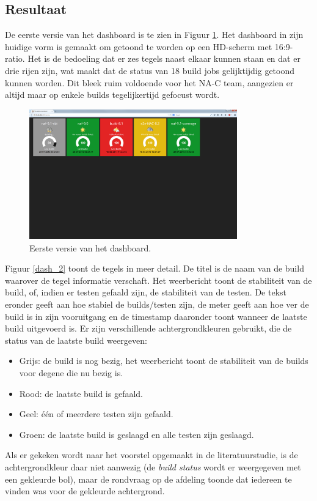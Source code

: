 \documentclass[10pt,a4paper]{article}
\begin{document}
\subsection{Resultaat}
\label{resultaat}
De eerste versie van het dashboard is te zien in Figuur \ref{dash_1}. Het dashboard in zijn huidige vorm is gemaakt om getoond te worden op een HD-scherm met 16:9-ratio. Het is de bedoeling dat er zes tegels naast elkaar kunnen staan en dat er drie rijen zijn, wat maakt dat de status van 18 build jobs gelijktijdig getoond kunnen worden. Dit bleek ruim voldoende voor het NA-C team, aangezien er altijd maar op enkele builds tegelijkertijd gefocust wordt.

\begin{figure}[ht!]
\centering
\includegraphics[width=90mm]{dashboard_screenshot1.png}
\caption{Eerste versie van het dashboard.} 
\label{dash_1}
\end{figure}

Figuur \ref{dash_2} toont de tegels in meer detail. De titel is de naam van de build waarover de tegel informatie verschaft. Het weerbericht toont de stabiliteit van de build, of, indien er testen gefaald zijn, de stabiliteit van de testen. De tekst eronder geeft aan hoe stabiel de builds/testen zijn, de meter geeft aan hoe ver de build is in zijn vooruitgang en de timestamp daaronder toont wanneer de laatste build uitgevoerd is.
Er zijn verschillende achtergrondkleuren gebruikt, die de status van de laatste build weergeven:
\begin{itemize}
\item Grijs: de build is nog bezig, het weerbericht toont de stabiliteit van de builds voor degene die nu bezig is.
\item Rood: de laatste build is gefaald.
\item Geel: \'e\'en of meerdere testen zijn gefaald.
\item Groen: de laatste build is geslaagd en alle testen zijn geslaagd. 
\end{itemize}
Als er gekeken wordt naar het voorstel opgemaakt in de literatuurstudie, is de achtergrondkleur daar niet aanwezig (de \textit{build status} wordt er weergegeven met een gekleurde bol), maar de rondvraag op de afdeling toonde dat iedereen te vinden was voor de gekleurde achtergrond.
\end{document}
